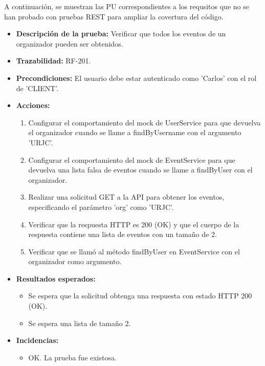 A continuación, se muestran las PU correspondientes a los requsitos que no se han probado con pruebas REST para ampliar la covertura del código.

\begin{itemize}
    \item \textbf{Descripción de la prueba:} Verificar que todos los eventos de un organizador pueden ser obtenidos.
    \item \textbf{Trazabilidad:} RF-201.
    \item \textbf{Precondiciones:} El usuario debe estar autenticado como 'Carlos' con el rol de 'CLIENT'.
    \item \textbf{Acciones:}
    \begin{enumerate}
        \item Configurar el comportamiento del mock de UserService para que devuelva el organizador cuando se llame a findByUsername con el argumento 'URJC'.
        \item Configurar el comportamiento del mock de EventService para que devuelva una lista falsa de eventos cuando se llame a findByUser con el organizador.
        \item Realizar una solicitud GET a la API para obtener los eventos, especificando el parámetro 'org' como 'URJC'.
        \item Verificar que la respuesta HTTP es 200 (OK) y que el cuerpo de la respuesta contiene una lista de eventos con un tamaño de 2.
        \item Verificar que se llamó al método findByUser en EventService con el organizador como argumento.
    \end{enumerate}
    \item \textbf{Resultados esperados:}
    \begin{itemize}
        \item Se espera que la solicitud obtenga una respuesta con estado HTTP 200 (OK).
        \item Se espera una lista de tamaño 2.
    \end{itemize}
    \item \textbf{Incidencias:}
    \begin{itemize}
        \item OK. La prueba fue existosa.
    \end{itemize}
\end{itemize}

